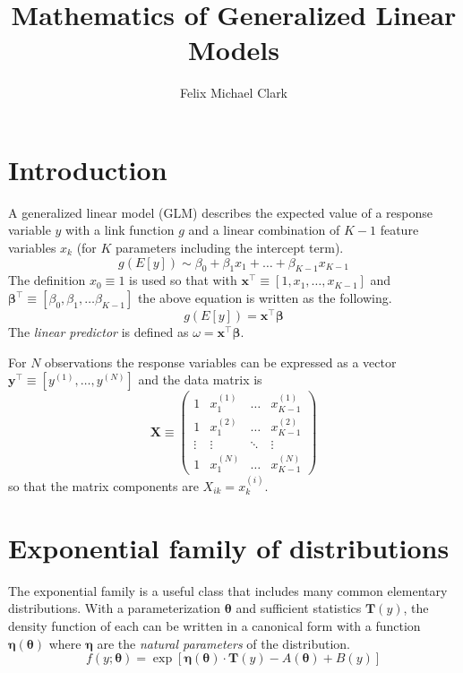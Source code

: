 \documentclass{article}
\title{Mathematics of Generalized Linear Models}
\author{Felix Michael Clark}
\newcommand{\bbeta}{\boldsymbol{\beta}}
\begin{document}
\maketitle
\tableofcontents

\section{Introduction}

A generalized linear model (GLM) describes the expected value of a response
variable \(y\) with a link function \(g\) and a linear combination of \(K-1\)
feature variables \(x_k\) (for \(K\) parameters including the intercept term).
\[ g(E[y]) \sim \beta_0 + \beta_1 x_1 + \ldots + \beta_{K-1} x_{K-1} \]
The definition \(x_0 \equiv 1\) is used so that with \(\mathbf{x}^\intercal \equiv [1, x_1,
\ldots, x_{K-1}]\) and \(\bbeta^\intercal \equiv [\beta_0, \beta_1, \ldots
\beta_{K-1}]\) the above equation is written as the following.
\[ g(E[y]) = \mathbf{x}^\intercal \bbeta\]
The \emph{linear predictor} is defined as \(\omega = \mathbf{x}^\intercal
\bbeta \).

For \(N\) observations the response variables can be expressed as a vector
\(\mathbf{y}^\intercal \equiv [y^{(1)}, \ldots, y^{(N)}]\) and the data matrix is
\begin{equation}
	\mathbf{X} \equiv \begin{pmatrix}
    1      & x_1^{(1)} & \ldots & x_{K-1}^{(1)} \\
    1      & x_1^{(2)} & \ldots & x_{K-1}^{(2)} \\
		\vdots & \vdots    & \ddots & \vdots    \\
    1      & x_1^{(N)} & \ldots & x_{K-1}^{(N)}
	\end{pmatrix}
\end{equation}
so that the matrix components are \(X_{ik} = x_{k}^{(i)}\).

\section{Exponential family of distributions}

The exponential family is a useful class that includes many common elementary
distributions. With a parameterization \(\boldsymbol{\theta}\) and sufficient
statistics \(\mathbf{T}(y)\), the density function of each can be written in a
canonical form with a function \(\boldsymbol{\eta}(\boldsymbol{\theta})\) where
\(\boldsymbol{\eta}\) are the \emph{natural parameters} of the distribution.
\[ f(y; \boldsymbol{\theta}) = \exp\left[ \boldsymbol{\eta}(\boldsymbol{\theta}) \cdot \mathbf{T}(y) - A(\boldsymbol{\theta}) + B(y) \right] \]
\end{document}
